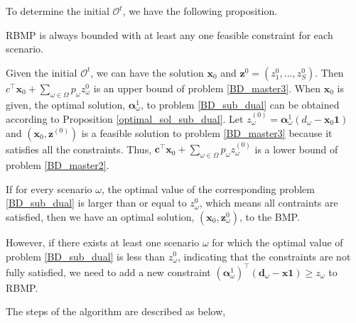 To determine the initial $\mathcal{O}^{t}$, we have the following proposition.

\begin{prop}\label{one_ep_feasible}
RBMP is always bounded with at least any one feasible constraint for each scenario.
\end{prop}

Given the initial $\mathcal{O}^{t}$, we can have the solution $\mathbf{x}_{0}$ and $\mathbf{z}^{0} =(z^{0}_1,\ldots, z^{0}_S)$. Then $c^{\intercal} \mathbf{x}_0 + \sum_{\omega \in \Omega} p_{\omega} z_{\omega}^{0}$ is an upper bound of problem \eqref{BD_master3}. When $\mathbf{x}_0$ is given, the optimal solution, $\bm{\alpha}_{\omega}^{1}$, to problem \eqref{BD_sub_dual} can be obtained according to Proposition \ref{optimal_sol_sub_dual}. Let $z_{\omega}^{(0)} = \bm{\alpha}_{\omega}^{1}(d_{\omega} - \mathbf{x}_0 \mathbf{1})$ and $(\mathbf{x}_0, \mathbf{z}^{(0)})$ is a feasible solution to problem \eqref{BD_master3} because it satisfies all the constraints. Thus, $\mathbf{c}^{\intercal} \mathbf{x}_0 + \sum_{\omega \in \Omega} p_{\omega} z_{\omega}^{(0)}$ is a lower bound of problem \eqref{BD_master2}.

If for every scenario $\omega$, the optimal value of the corresponding problem \eqref{BD_sub_dual} is larger than or equal to $z_{\omega}^{0}$, which means all contraints are satisfied, then we have an optimal solution, $(\mathbf{x}_{0}, \mathbf{z}_{\omega}^{0})$, to the BMP. 

However, if there exists at least one scenario $\omega$ for which the optimal value of problem \eqref{BD_sub_dual} is less than $z_{\omega}^{0}$, indicating that the constraints are not fully satisfied, we need to add a new constraint $(\bm{\alpha}_{\omega}^{1})^{\intercal}(\mathbf{d}_{\omega} - \mathbf{x} \mathbf{1}) \geq z_{\omega}$ to RBMP.




The steps of the algorithm are described as below,

